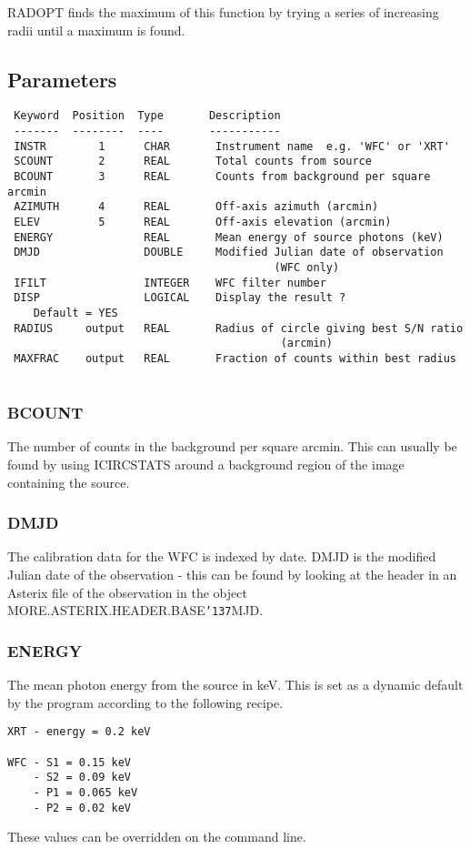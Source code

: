 \documentclass{book}
\renewcommand{\_}{{\tt\char'137}}     %
\begin{document}
RADOPT finds the maximum of this function by trying a series of
increasing radii until a maximum is found.
 
\subsection{Parameters}
\begin{verbatim}
 Keyword  Position  Type       Description
 -------  --------  ----       -----------
 INSTR        1      CHAR       Instrument name  e.g. 'WFC' or 'XRT'
 SCOUNT       2      REAL       Total counts from source
 BCOUNT       3      REAL       Counts from background per square arcmin
 AZIMUTH      4      REAL       Off-axis azimuth (arcmin)
 ELEV         5      REAL       Off-axis elevation (arcmin)
 ENERGY              REAL       Mean energy of source photons (keV)
 DMJD                DOUBLE     Modified Julian date of observation
                                         (WFC only)
 IFILT               INTEGER    WFC filter number
 DISP                LOGICAL    Display the result ?
    Default = YES
 RADIUS     output   REAL       Radius of circle giving best S/N ratio
                                          (arcmin)
 MAXFRAC    output   REAL       Fraction of counts within best radius
 
\end{verbatim}\subsubsection{BCOUNT}
The number of counts in the background per square arcmin. This
can usually be found by using ICIRCSTATS around a background
region of the image containing the source.
 
\subsubsection{DMJD}
The calibration data for the WFC is indexed by date. DMJD is the
modified Julian date of the observation - this can be found by
looking at the header in an Asterix file of the observation in
the object MORE.ASTERIX.HEADER.BASE\_MJD.
 
\subsubsection{ENERGY}
The mean photon energy from the source in keV. This is set as a
dynamic default by the program according to the following recipe.
 
\begin{verbatim}
XRT - energy = 0.2 keV
 
WFC - S1 = 0.15 keV
    - S2 = 0.09 keV
    - P1 = 0.065 keV
    - P2 = 0.02 keV
\end{verbatim}
These values can be overridden on the command line.
 
\end{document}
